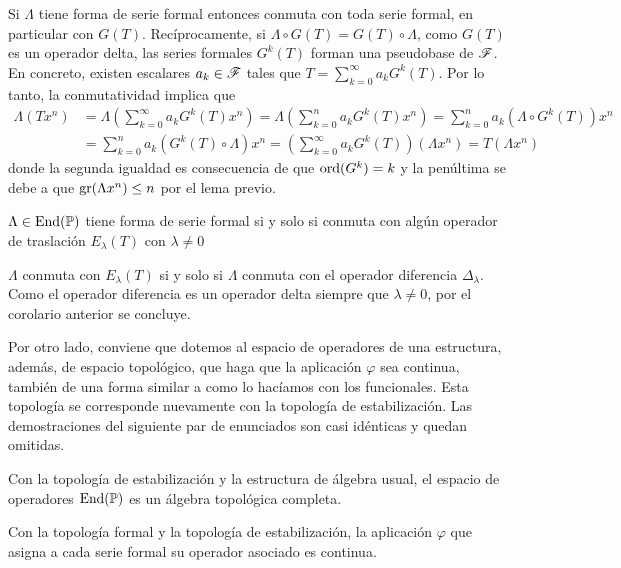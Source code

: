\begin{demo}
    Si $\Lambda$ tiene forma de serie formal entonces conmuta con toda serie formal, en particular con $G(T)$. Recíprocamente, si $\Lambda \circ G(T) = G(T) \circ \Lambda$, como $G(T)$ es un operador delta, las series formales $G^k(T)$ forman una pseudobase de $\mathscr{F}$. En concreto, existen escalares $a_k \in \mathscr{F}$ tales que $T = \sum_{k = 0}^\infty a_k G^k(T)$. Por lo tanto, la conmutatividad implica que
    \begin{align*}
        \Lambda (T x^n) & = \Lambda\left(\sum_{k=0}^\infty a_k G^k(T) x^n\right) = \Lambda \left(\sum_{k=0}^n a_k G^k(T) x^n\right) = \sum_{k=0}^n a_k (\Lambda \circ G^k(T)) x^n\\
        & = \sum_{k=0}^n a_k (G^k(T) \circ \Lambda) x^n = \left(\sum_{k=0}^\infty a_k G^k(T)\right) (\Lambda x^n) = T (\Lambda x^n)
    \end{align*}  
    donde la segunda igualdad es consecuencia de que $\operatorname*{ord}(G^k) = k$ y la penúltima se debe a que $\operatorname{gr}(\Lambda x^n) \leq n$ por el lema previo.
\end{demo}

\begin{corolario}
    $\Lambda \in \operatorname*{End}(\mathbb{P})$ tiene forma de serie formal si y solo si conmuta con algún operador de traslación $E_{\lambda}(T)$ con $\lambda \neq 0$
\end{corolario}

\begin{demo}
    $\Lambda$ conmuta con $E_{\lambda}(T)$ si y solo si $\Lambda$ conmuta con el operador diferencia $\Delta_{\lambda}$. Como el operador diferencia es un operador delta siempre que $\lambda \neq 0$, por el corolario anterior se concluye.   
\end{demo}

Por otro lado, conviene que dotemos al espacio de operadores de una estructura, además, de espacio topológico, que haga que la aplicación $\varphi$ sea continua, también de una forma similar a como lo hacíamos con los funcionales. Esta topología se corresponde nuevamente con la topología de estabilización. Las demostraciones del siguiente par de enunciados son casi idénticas y quedan omitidas.

\begin{proposicion}
    Con la topología de estabilización y la estructura de álgebra usual, el espacio de operadores $\operatorname*{End}(\mathbb{P})$ es un álgebra topológica completa.
\end{proposicion}

\begin{proposicion}
    Con la topología formal y la topología de estabilización, la aplicación $\varphi$ que asigna a cada serie formal su operador asociado es continua.
\end{proposicion}


